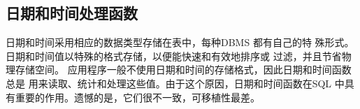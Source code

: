 \documentclass[11pt,a4paper,oneside]{book}
\begin{document}
\subsection{日期和时间处理函数}
日期和时间采用相应的数据类型存储在表中，每种DBMS 都有自己的特
殊形式。日期和时间值以特殊的格式存储，以便能快速和有效地排序或
过滤，并且节省物理存储空间。
应用程序一般不使用日期和时间的存储格式，因此日期和时间函数总是
用来读取、统计和处理这些值。由于这个原因，日期和时间函数在SQL
中具有重要的作用。遗憾的是，它们很不一致，可移植性最差。


\begin{lstlisting}[language=sql]
	
\end{lstlisting}
\begin{lstlisting}[language=sql]
	
\end{lstlisting}
\begin{lstlisting}[language=sql]
	
\end{lstlisting}
\begin{lstlisting}[language=sql]
	
\end{lstlisting}
\begin{lstlisting}[language=sql]
	
\end{lstlisting}
\begin{lstlisting}[language=sql]
	
\end{lstlisting}
\begin{lstlisting}[language=sql]
	
\end{lstlisting}
\begin{lstlisting}[language=sql]
	
\end{lstlisting}
\begin{lstlisting}[language=sql]
	
\end{lstlisting}
\end{document}
